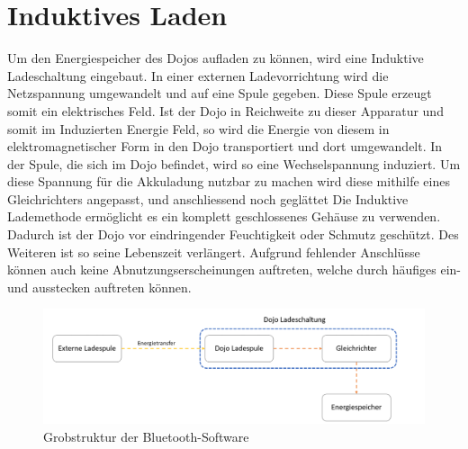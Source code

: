 \section{Induktives Laden}
Um den Energiespeicher des Dojos aufladen zu können, wird eine Induktive Ladeschaltung eingebaut. In einer externen Ladevorrichtung wird die Netzspannung umgewandelt und auf eine Spule gegeben. Diese Spule erzeugt somit ein elektrisches Feld. Ist der Dojo in Reichweite zu dieser Apparatur und somit im Induzierten Energie Feld, so wird die Energie von diesem in elektromagnetischer Form in den Dojo transportiert und dort umgewandelt. In der Spule, die sich im Dojo befindet, wird so eine Wechselspannung induziert. Um diese Spannung für die Akkuladung nutzbar zu machen wird diese mithilfe eines Gleichrichters angepasst, und anschliessend noch geglättet  Die Induktive Lademethode ermöglicht es ein komplett geschlossenes Gehäuse zu verwenden. Dadurch ist der Dojo vor eindringender Feuchtigkeit oder Schmutz geschützt. Des Weiteren ist so seine Lebenszeit verlängert. Aufgrund fehlender Anschlüsse können auch keine Abnutzungserscheinungen auftreten, welche durch häufiges ein- und ausstecken auftreten können. 

\begin{figure}[H]
\begin{center}
	\includegraphics[width=160mm]{data/Induktion.png}
	\caption{Grobstruktur der Bluetooth-Software} %
	\label{fig:first_layer}
\end{center}
\end{figure}
